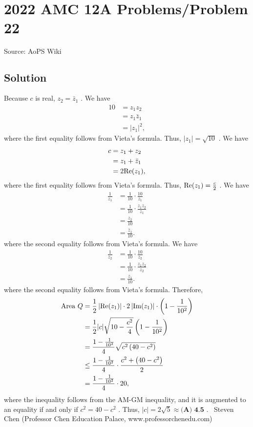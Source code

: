 \documentclass[12pt]{article}
\begin{document}
\section*{{2022 AMC 12A Problems/Problem 22}}
Source: AoPS Wiki

\subsection*{Solution}
Because $c$ is real, $z_2 = \bar z_1$ .
We have \begin{align*} 10 & = z_1 z_2 \\ & = z_1 \bar z_1 \\ & = |z_1|^2 , \end{align*} where the first equality follows from Vieta's formula. Thus, $|z_1| = \sqrt{10}$ . We have \begin{align*} c & = z_1 + z_2 \\ & = z_1 + \bar z_1 \\ & = 2 {\rm Re}(z_1), \end{align*} where the first equality follows from Vieta's formula. Thus, ${\rm Re}(z_1) = \frac{c}{2}$ . We have \begin{align*} \frac{1}{z_1} & = \frac{1}{10}\cdot\frac{10}{z_1} \\ & = \frac{1}{10}\cdot\frac{z_1 z_2}{z_1} \\ & = \frac{z_2}{10} \\ & = \frac{\bar z_1}{10}. \end{align*} where the second equality follows from Vieta's formula. We have \begin{align*} \frac{1}{z_2} & = \frac{1}{10}\cdot\frac{10}{z_2} \\ & = \frac{1}{10}\cdot\frac{z_1 z_2}{z_2} \\ & = \frac{z_1}{10}. \end{align*} where the second equality follows from Vieta's formula. Therefore, \begin{align*} {\rm Area} \ Q & = \frac{1}{2} \left| {\rm Re}(z_1) \right| \cdot 2 \left| {\rm Im}(z_1) \right| \cdot \left( 1 - \frac{1}{10^2} \right) \\ & = \frac{1}{2} |c| \sqrt{10 - \frac{c^2}{4}} \left( 1 - \frac{1}{10^2} \right) \\ & = \frac{1 - \frac{1}{10^2}}{4} \sqrt{c^2 \left( 40 - c^2 \right)} \\ & \leq \frac{1 - \frac{1}{10^2}}{4} \cdot \frac{c^2 + \left( 40 - c^2 \right)}{2} \\ & = \frac{1 - \frac{1}{10^2}}{4} \cdot 20 , \end{align*} where the inequality follows from the AM-GM inequality, and it is augmented to an equality if and only if $c^2 = 40 - c^2$ .
Thus, $|c| = 2 \sqrt{5} \approx \boxed{\textbf{(A) 4.5}}$ . ~Steven Chen (Professor Chen Education Palace, www.professorchenedu.com)
\end{document}
